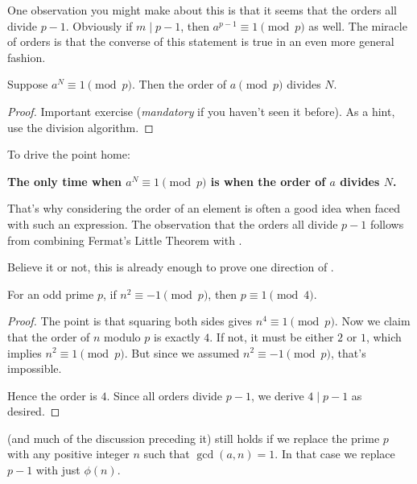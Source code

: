 \documentclass[11pt]{scrartcl}
\begin{document}
One observation you might make about this is that it seems that the orders all divide $p-1$.
Obviously if $m \mid p-1$, then $a^{p-1} \equiv 1 \pmod p$ as well.
The miracle of orders is that the converse of this statement is true in an even more general fashion.

\begin{theorem}
  Suppose $a^N \equiv 1 \pmod p$.
  Then the order of $a \pmod p$ divides $N$.
  \label{thm:fundamental_order}
\end{theorem}
\begin{proof}
  Important exercise (\emph{mandatory} if you haven't seen it before).
  As a hint, use the division algorithm.
\end{proof}

To drive the point home:
\begin{center}
  \begin{minipage}[h]{9cm}
    \begin{mdframed}
    \bfseries
    \color{magenta}
    The only time when $a^N \equiv 1 \pmod p$ is
    when the order of $a$ divides $N$.
    \end{mdframed}
  \end{minipage}
\end{center}
That's why considering the order of an element is often a good idea when faced with such an expression.
The observation that the orders all divide $p-1$ follows from combining
Fermat's Little Theorem with .

Believe it or not, this is already enough to prove one direction of .

\begin{proposition}
  For an odd prime $p$, if $n^2 \equiv -1 \pmod p$, then $p \equiv 1 \pmod 4$.
\end{proposition}
\begin{proof}
  The point is that squaring both sides gives $n^4 \equiv 1 \pmod p$.
  Now we claim that the order of $n$ modulo $p$ is exactly $4$.
  If not, it must be either $2$ or $1$, which implies $n^2 \equiv 1 \pmod p$.
  But since we assumed $n^2 \equiv -1 \pmod p$, that's impossible.

  Hence the order is $4$.
  Since all orders divide $p-1$, we derive $4 \mid p-1$ as desired.
\end{proof}

\begin{remark*}
   (and much of the discussion preceding it)
  still holds if we replace the prime $p$ with
  any positive integer $n$ such that $\gcd(a,n) = 1$.
  In that case we replace $p-1$ with just $\phi(n)$.
\end{remark*}
\end{document}
